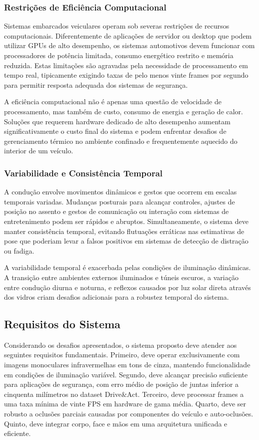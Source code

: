 \documentclass[12pt, a4paper]{article}
\begin{document}
\subsubsection{Restrições de Eficiência Computacional}

Sistemas embarcados veiculares operam sob severas restrições de recursos computacionais. Diferentemente de aplicações de servidor ou desktop que podem utilizar GPUs de alto desempenho, os sistemas automotivos devem funcionar com processadores de potência limitada, consumo energético restrito e memória reduzida. Estas limitações são agravadas pela necessidade de processamento em tempo real, tipicamente exigindo taxas de pelo menos vinte frames por segundo para permitir resposta adequada dos sistemas de segurança.

A eficiência computacional não é apenas uma questão de velocidade de processamento, mas também de custo, consumo de energia e geração de calor. Soluções que requerem hardware dedicado de alto desempenho aumentam significativamente o custo final do sistema e podem enfrentar desafios de gerenciamento térmico no ambiente confinado e frequentemente aquecido do interior de um veículo.

\subsubsection{Variabilidade e Consistência Temporal}

A condução envolve movimentos dinâmicos e gestos que ocorrem em escalas temporais variadas. Mudanças posturais para alcançar controles, ajustes de posição no assento e gestos de comunicação ou interação com sistemas de entretenimento podem ser rápidos e abruptos. Simultaneamente, o sistema deve manter consistência temporal, evitando flutuações erráticas nas estimativas de pose que poderiam levar a falsos positivos em sistemas de detecção de distração ou fadiga.

A variabilidade temporal é exacerbada pelas condições de iluminação dinâmicas. A transição entre ambientes externos iluminados e túneis escuros, a variação entre condução diurna e noturna, e reflexos causados por luz solar direta através dos vidros criam desafios adicionais para a robustez temporal do sistema.

\subsection{Requisitos do Sistema}

Considerando os desafios apresentados, o sistema proposto deve atender aos seguintes requisitos fundamentais. Primeiro, deve operar exclusivamente com imagens monoculares infravermelhas em tons de cinza, mantendo funcionalidade em condições de iluminação variável. Segundo, deve alcançar precisão suficiente para aplicações de segurança, com erro médio de posição de juntas inferior a cinquenta milímetros no dataset Drive\&Act. Terceiro, deve processar frames a uma taxa mínima de vinte FPS em hardware de gama média. Quarto, deve ser robusto a oclusões parciais causadas por componentes do veículo e auto-oclusões. Quinto, deve integrar corpo, face e mãos em uma arquitetura unificada e eficiente.
\end{document}
